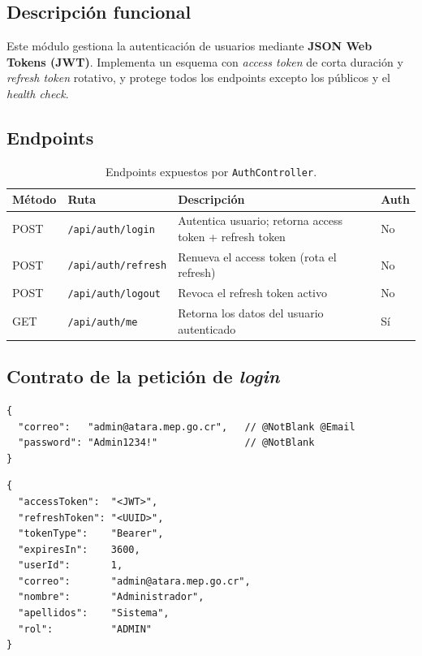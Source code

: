 \documentclass[11pt,a4paper,oneside]{article}
\newcommand{\code}[1]{\texttt{\small #1}}
\begin{document}
\subsection{Descripción funcional}

Este módulo gestiona la autenticación de usuarios mediante \textbf{JSON Web Tokens (JWT)}.
Implementa un esquema con \emph{access token} de corta duración y \emph{refresh token}
rotativo, y protege todos los endpoints excepto los públicos y el \emph{health check}.

\subsection{Endpoints}

\begin{table}[h]
\centering\renewcommand{\arraystretch}{1.2}\small
\begin{tabular}{@{}p{1.4cm} p{4.0cm} p{6.5cm} p{1.5cm}@{}}
\toprule
\textbf{Método} & \textbf{Ruta} & \textbf{Descripción} & \textbf{Auth} \\
\midrule
POST & \code{/api/auth/login}    & Autentica usuario; retorna access token + refresh token & No \\
POST & \code{/api/auth/refresh}  & Renueva el access token (rota el refresh)               & No \\
POST & \code{/api/auth/logout}   & Revoca el refresh token activo                          & No \\
GET  & \code{/api/auth/me}       & Retorna los datos del usuario autenticado               & Sí \\
\bottomrule
\end{tabular}
\caption{Endpoints expuestos por \code{AuthController}.}
\end{table}

\subsection{Contrato de la petición de \emph{login}}

\begin{lstlisting}[style=json,caption={POST \code{/api/auth/login} — \emph{Request body}}]
{
  "correo":   "admin@atara.mep.go.cr",   // @NotBlank @Email
  "password": "Admin1234!"               // @NotBlank
}
\end{lstlisting}

\begin{lstlisting}[style=json,caption={POST \code{/api/auth/login} — \emph{Response body} (200 OK)}]
{
  "accessToken":  "<JWT>",
  "refreshToken": "<UUID>",
  "tokenType":    "Bearer",
  "expiresIn":    3600,
  "userId":       1,
  "correo":       "admin@atara.mep.go.cr",
  "nombre":       "Administrador",
  "apellidos":    "Sistema",
  "rol":          "ADMIN"
}
\end{lstlisting}
\end{document}
